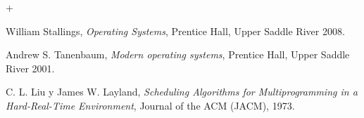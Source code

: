 \documentclass[a4paper,spanish]{article}
\begin{document}
 
\thispagestyle{empty}


+\maketitle

\newpage


\newpage


\newpage


\newpage


\newpage
 

\newpage

\begin{thebibliography}{9}

  William Stallings,
  \emph{Operating Systems},
  Prentice Hall, Upper Saddle River
  2008.

  Andrew S. Tanenbaum,
  \emph{Modern operating systems},
  Prentice Hall, Upper Saddle River
  2001.

  C. L. Liu y James W. Layland,
  \emph{Scheduling Algorithms for Multiprogramming in a Hard-Real-Time Environment},  Journal of the ACM  (JACM), 1973.

\end{thebibliography}
\end{document}
